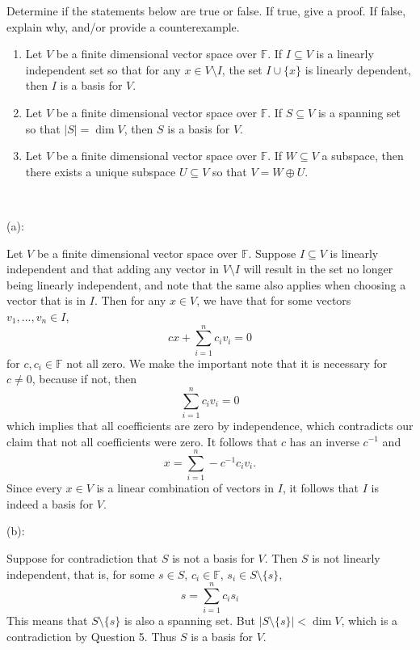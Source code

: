 \documentclass{article}
\theoremstyle{plain} %
\numberwithin{thm}{section} %
\theoremstyle{definition}
\begin{document}
    \begin{question}{11}
        Determine if the statements below are true or false. If true, give a proof. If false, explain why, and/or provide a counterexample.
        
        \begin{enumerate}[label=(\alph*)]
            \item Let \( V \) be a finite dimensional vector space over \( \mathbb{F} \). If \( I \subseteq V \) is a linearly independent set so that for any \( x \in V \setminus I \), the set \( I \cup \{ x \} \) is linearly dependent, then \( I \) is a basis for \( V \).
            \item Let \( V \) be a finite dimensional vector space over \( \mathbb{F} \). If \( S \subseteq V \) is a spanning set so that \( |S| = \dim V \), then \( S \) is a basis for \( V \).
            \item Let \( V \) be a finite dimensional vector space over \( \mathbb{F} \). If \( W \subseteq V \) a subspace, then there exists a unique subspace \( U \subseteq V \) so that \( V = W \oplus U \).
        \end{enumerate}
        \tcblower
        \ 

        (a):

        Let \(V\) be a finite dimensional vector space over \(\mathbb{F}\). Suppose \(I \subseteq V\) is linearly independent and that adding any vector in \(V\setminus I\) will result in the set no longer being linearly independent, and note that the same also applies when choosing a vector that is in \(I\). Then for any \(x \in V\), we have that for some vectors \(v_1, ..., v_n \in I\),
        \[
            cx + \sum_{i=1}^{n} c_i v_i = 0
        \]
        for \(c, c_i \in \mathbb{F}\) not all zero. We make the important note that it is necessary for \(c \neq 0\), because if not, then
        \[
            \sum_{i=1}^{n} c_i v_i = 0
        \]
        which implies that all coefficients are zero by independence, which contradicts our claim that not all coefficients were zero. It follows that \(c\) has an inverse \(c^{-1}\) and
        \[
            x = \sum_{i=1}^{n} -c^{-1}c_i v_i.
        \]
        Since every \(x \in V\) is a linear combination of vectors in \(I\), it follows that \(I\) is indeed a basis for \(V\).

        \medskip

        (b):

        Suppose for contradiction that \(S\) is not a basis for \(V\). Then \(S\) is not linearly independent, that is, for some \(s \in S\), \(c_i \in \mathbb{F}\), \(s_i \in S\setminus \{ s \}\),
        \[
            s = \sum_{i=1}^{n} c_i s_i
        \]
        This means that \(S\setminus \{ s \}\) is also a spanning set. But \(|S\setminus \{ s \} | < \dim V\), which is a contradiction by Question 5. Thus \(S\) is a basis for \(V\).


\end{question}
\end{document}
